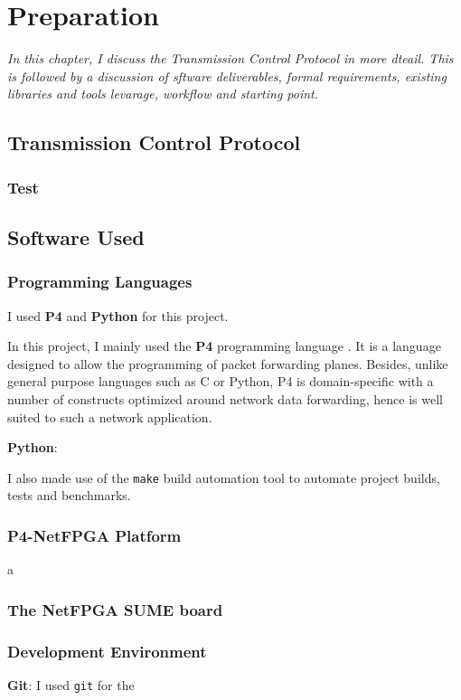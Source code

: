 \chapter{Preparation}
\textit{In this chapter, I discuss the Transmission Control Protocol in more dteail. This is followed by a discussion of sftware deliverables, formal requirements, existing libraries and tools levarage, workflow and starting point.
}
\section{Transmission Control Protocol}
\subsection{Test}

\section{Software Used}
	\subsection{Programming Languages}
	I used \textbf{P4} and \textbf{Python} for this project.
	
	In this project, I mainly used the \textbf{P4} programming language \cite{p4.org}. It is a language designed to allow the programming of packet forwarding planes. Besides, unlike general purpose languages such as C or Python, P4 is domain-specific with a number of constructs optimized around network data forwarding, hence is well suited to such a network application.
	
	\textbf{Python}: 
	
	I also made use of the \texttt{make} build automation tool to automate project builds, tests and benchmarks.
	\subsection{P4-NetFPGA Platform}
	a
	\subsection{The NetFPGA SUME board}
	
	\subsection{Development Environment}
	\textbf{Git}: I used \texttt{git} for the 
	
